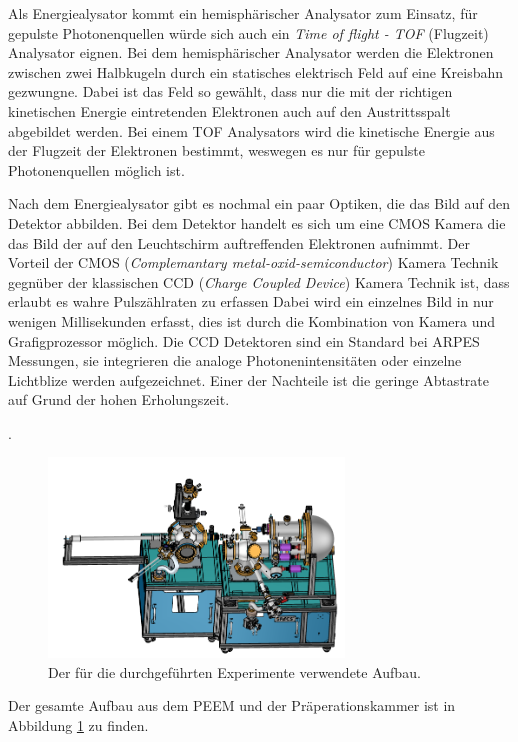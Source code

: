         Als Energiealysator kommt ein hemisphärischer Analysator zum Einsatz, für gepulste Photonenquellen würde sich auch ein \textit{Time of flight - TOF} (Flugzeit) Analysator eignen.
        Bei dem hemisphärischer Analysator werden die Elektronen zwischen zwei Halbkugeln durch ein statisches elektrisch Feld auf eine Kreisbahn gezwungne.
        Dabei ist das Feld so gewählt, dass nur die mit der richtigen kinetischen Energie eintretenden Elektronen auch auf den Austrittsspalt abgebildet werden.
        Bei einem TOF Analysators wird die kinetische Energie aus der Flugzeit der Elektronen bestimmt, weswegen es nur für gepulste Photonenquellen möglich ist.

        Nach dem Energiealysator gibt es nochmal ein paar Optiken, die das Bild auf den Detektor abbilden.
        Bei dem Detektor handelt es sich um eine CMOS Kamera die das Bild der auf den Leuchtschirm auftreffenden Elektronen aufnimmt.
        Der Vorteil der CMOS (\textit{Complemantary metal-oxid-semiconductor}) Kamera Technik gegnüber der klassischen CCD (\textit{Charge Coupled Device}) Kamera Technik ist, dass erlaubt es wahre Pulszählraten zu erfassen 
        Dabei wird ein einzelnes Bild in nur wenigen Millisekunden erfasst, dies ist durch die Kombination von Kamera und Grafigprozessor möglich.
        Die CCD Detektoren sind ein Standard bei ARPES Messungen, sie integrieren die analoge Photonenintensitäten oder einzelne Lichtblize werden aufgezeichnet.
        Einer der Nachteile ist die geringe Abtastrate auf Grund der hohen Erholungszeit.

        \cite{CMOS}.

      
        \begin{figure}
            \centering
            \includegraphics[width=0.7\textwidth]{./content/MM.png}
            \caption{Der für die durchgeführten Experimente verwendete Aufbau.}
            \label{fig:aufbau}
        \end{figure}
        Der gesamte Aufbau aus dem PEEM und der Präperationskammer ist in Abbildung \ref{fig:aufbau} zu finden.

